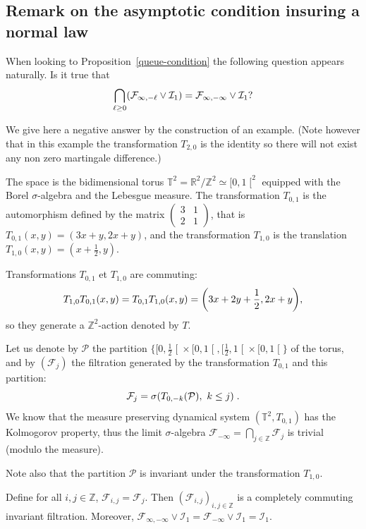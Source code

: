 \documentclass[AHL,Unicode,longabstracts,published]{cedram}
\newcommand{\bbT}{\mathbb{T}}
\newcommand{\Z}{\mathbb{Z}}
\newcommand*\R{\mathbb{R}}
\newcommand*\I{\mathcal{I}}
\newcommand*\F{\mathcal{F}}
\renewcommand*\P{\mathcal{P}}
\newcommand{\Fca}{\mathcal{F}}
\let\originalleft\left
\let\originalright\right
\renewcommand{\left}{\mathopen{}\mathclose\bgroup\originalleft}
\renewcommand{\right}{\aftergroup\egroup\originalright}
\begin{document}
\subsection{Remark on the asymptotic condition insuring a normal law}\label{trivial-queue}

When looking to Proposition~\ref{queue-condition} the following question appears naturally. Is it true that
\begin{equation}\label{eq:bad_limit}
\bigcap_{\ell\geq0}\left(\F_{\infty,-\ell}\vee\I_1\right) = \F_{\infty,-\infty}\vee\I_1?
\end{equation}

We give here a negative answer by the construction of an example. (Note however that in this example the transformation $T_{2,0}$ is the identity so there will not exist any non zero martingale difference.)

The space is the bidimensional torus $\bbT^2=\R^2/\Z^2\simeq[0,1\mathclose{[}^2$ equipped with the Borel $\sigma$-algebra and the Lebesgue measure. The transformation $T_{0,1}$ is the automorphism defined by the matrix $
(\begin{smallmatrix} 
3&1\\2&1
\end{smallmatrix})$, that is $T_{0,1}(x,y)=(3x+y,2x+y)$, and the transformation $T_{1,0}$ is the translation $T_{1,0}(x,y)=(x+\frac12,y)$.

Transformations $T_{0,1}$ et $T_{1,0}$ are commuting:
\[
T_{1,0}T_{0,1}(x,y)=T_{0,1}T_{1,0}(x,y)=\left(3x+2y+\frac12,2x+y\right),
\]
so they generate a $\Z^2$-action denoted by $T$.

Let us denote by $\P$ the partition $\{[0,\frac12\mathclose{[}\times[0,1\mathclose{[},[\frac12,1\mathclose{[}\times[0,1\mathclose{[}\}$ of the torus, and by $(\F_j)$ the filtration generated by the transformation $T_{0,1}$ and this partition:
\[
\F_j=\sigma\left(T_{0,-k}\left(\P\right),\ k\leq j\right)\;.
\]
We know that the measure preserving dynamical system $(\bbT^2,T_{0,1})$ has the Kolmogorov property, thus the limit $\sigma$-algebra $\F_{-\infty}=\bigcap_{j\in\Z}\F_j$ is trivial (modulo the measure).

Note also that the partition $\P$ is invariant under the transformation $T_{1,0}$.

Define for all $i,j\in\Z$, $\Fca_{i,j}=\Fca_j$. Then $(\Fca_{i,j})_{i,j\in\Z}$ is a completely commuting invariant filtration. Moreover, $\Fca_{\infty,-\infty}\vee\I_1=\Fca_{-\infty}\vee\I_1=\I_1$.
\end{document}
